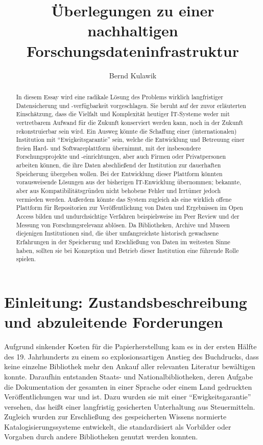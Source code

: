 \documentclass[a4paper,
fontsize=11pt,
oneside,
numbers=noperiodatend,
parskip=half-,
bibliography=totoc,
final
]{scrartcl}
\title{\LARGE{Überlegungen zu einer nachhaltigen Forschungsdateninfrastruktur}}
\author{Bernd Kulawik} %
\date{}
\begin{document}
\maketitle
\thispagestyle{fancyplain} 

\begin{abstract}
\noindent
In diesem Essay wird eine radikale Lösung des Problems wirklich
langfristiger Datensicherung und -verfügbarkeit vorgeschlagen. Sie
beruht auf der zuvor erläuterten Einschätzung, dass die Vielfalt und
Komplexität heutiger IT-Systeme weder mit vertretbarem Aufwand für die
Zukunft konserviert werden kann, noch in der Zukunft rekonstruierbar
sein wird. Ein Ausweg könnte die Schaffung einer (internationalen)
Institution mit ``Ewigkeitsgarantie'' sein, welche die Entwicklung und
Betreuung einer freien Hard- und Softwareplattform übernimmt, mit der
insbesondere Forschungsprojekte und -einrichtungen, aber auch Firmen
oder Privatpersonen arbeiten können, die ihre Daten abschließend der
Institution zur dauerhaften Speicherung übergeben wollen. Bei der
Entwicklung dieser Plattform könnten vorausweisende Lösungen aus der
bisherigen IT-Enwicklung übernommen; bekannte, aber aus
Kompatibilitätsgründen nicht behobene Fehler und Irrtümer jedoch
vermieden werden. Außerdem könnte das System zugleich als eine wirklich
offene Plattform für Repositorien zur Veröffentlichung von Daten und
Ergebnissen im Open Access bilden und undurchsichtige Verfahren
beispielsweise im Peer Review und der Messung von Forschungsrelevanz
ablösen. Da Bibliotheken, Archive und Museen diejenigen Institutionen
sind, die über umfangreichste historisch gewachsene Erfahrungen in der
Speicherung und Erschließung von Daten im weitesten Sinne haben, sollten
sie bei Konzeption und Betrieb dieser Institution eine führende Rolle
spielen.
\end{abstract}

\hypertarget{einleitung-zustandsbeschreibung-und-abzuleitende-forderungen}{%
\section{Einleitung: Zustandsbeschreibung und abzuleitende
Forderungen}\label{einleitung-zustandsbeschreibung-und-abzuleitende-forderungen}}

Aufgrund sinkender Kosten für die Papierherstellung kam es in der ersten
Hälfte des 19. Jahrhunderts zu einem so explosionsartigen Anstieg des
Buchdrucks, dass keine einzelne Bibliothek mehr den Ankauf aller
relevanten Literatur bewältigen konnte. Daraufhin entstanden Staats- und
Nationalbibliotheken, deren Aufgabe die Dokumentation der gesamten in
einer Sprache oder einem Land gedruckten Veröffentlichungen war und ist.
Dazu wurden sie mit einer \enquote{Ewigkeitsgarantie} versehen, das
heißt einer langfristig gesicherten Unterhaltung aus Steuermitteln.
Zugleich wurden zur Erschließung des gespeicherten Wissens normierte
Katalogisierungssysteme entwickelt, die standardisiert als Vorbilder
oder Vorgaben durch andere Bibliotheken genutzt werden konnten.
\end{document}
